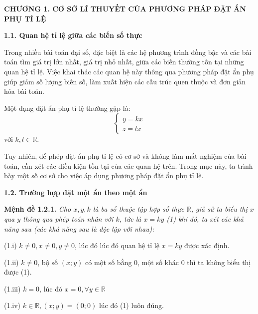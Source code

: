 \documentclass[12pt]{report}
\begin{document}
\newpage
\noindent \textbf{CHƯƠNG 1. CƠ SỞ LÍ THUYẾT CỦA PHƯƠNG PHÁP ĐẶT ẨN PHỤ TỈ LỆ}

\vspace{0.3cm}
\noindent \textbf{1.1. Quan hệ tỉ lệ giữa các biến số thực}

\vspace{0.2cm}
Trong nhiều bài toán đại số, đặc biệt là các hệ phương trình đồng bậc và các bài toán tìm giá trị lớn nhất, giá trị nhỏ nhất, giữa các biến thường tồn tại những quan hệ tỉ lệ. Việc khai thác các quan hệ này thông qua phương pháp đặt ẩn phụ giúp giảm số lượng biến số, làm xuất hiện các cấu trúc quen thuộc và đơn giản hóa bài toán.

Một dạng đặt ẩn phụ tỉ lệ thường gặp là:
\[ %
\begin{cases} %
y = kx
\\ %
z = lx 
\end{cases}
\]
với $k, l \in \mathbb{R}$. %

Tuy nhiên, để phép đặt ẩn phụ tỉ lệ có cơ sở và không làm mất nghiệm của bài toán, cần xét các điều kiện tồn tại của các quan hệ trên. Trong mục này, ta trình bày một số cơ sở cho việc áp dụng phương pháp đặt ẩn phụ tỉ lệ.

\vspace{0.4cm}
\noindent \textbf{1.2. Trường hợp đặt một ẩn theo một ẩn}

\vspace{0.2cm}
\noindent \textbf{Mệnh đề 1.2.1.} \textit{Cho $x, y, k$ là ba số thuộc tập hợp số thực $\mathbb{R}$, giả sử ta biểu thị $x$ qua $y$ thông qua phép toán nhân với $k$, tức là $x = ky$ (1) khi đó, ta xét các khả năng sau (các khả năng sau là độc lập với nhau):}

(1.i) $k \neq 0, x \neq 0, y \neq 0$, lúc đó lúc đó quan hệ tỉ lệ $x = ky$ được xác định.

(1.ii) $k \neq 0$, bộ số $(x; y)$ có một số bằng 0, một số khác 0 thì ta không biểu thị được (1).

(1.iii) $k = 0$, lúc đó $x = 0, \forall y \in \mathbb{R}$

(1.iv) $k \in \mathbb{R}, (x; y) = (0; 0)$ lúc đó (1) luôn đúng.
\end{document}
